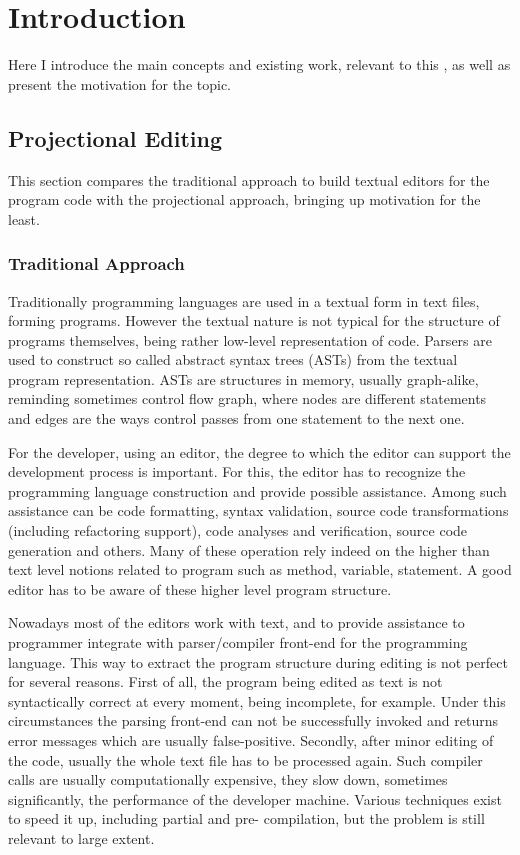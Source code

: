 \chapter{Introduction}
\label{chapter:Introduction}

Here I introduce the main concepts and existing work, relevant to this \MT, as well as present the motivation for the topic.
 
\section{Projectional Editing}

This section compares the traditional approach to build textual editors for the program code with
the projectional approach, bringing up  motivation for the least.

\subsection{Traditional Approach}
Traditionally programming languages are used in a textual form in text files, forming programs.
However the textual nature is not typical for the structure of programs themselves, being rather low-level
representation of code. Parsers are used to construct so called abstract syntax trees (ASTs) from the textual 
program representation. ASTs are structures in memory, usually graph-alike, reminding sometimes control flow
graph, where nodes are different statements and edges are the ways control passes from one statement to the 
next one.

For the developer, using an editor, the degree to which the editor can support the development process is 
important. For this, the editor has to recognize the programming language construction and provide possible assistance.
Among such assistance can be code formatting, syntax validation, source code transformations (including refactoring support), code analyses and verification, 
source code generation and others. Many of these operation rely indeed on the higher than text level notions related to program such as method,
variable, statement. A good editor has to be aware of these higher level program structure.

Nowadays most of the editors work with text, and to provide assistance to programmer integrate with parser/compiler front-end 
for the programming language. This way to extract the program structure during editing is not perfect for several reasons.
First of all, the program being edited as text is not syntactically correct at every moment, being incomplete, for 
example. Under this circumstances the parsing front-end can not be successfully invoked and returns error messages
which are usually false-positive. Secondly, after minor editing of the code, usually the whole text file has to be
processed again. Such compiler calls are usually computationally expensive, they slow down, sometimes significantly, 
the performance of the developer machine. Various techniques exist to speed it up, including partial and pre- compilation,
but the problem is still relevant to large extent. 

